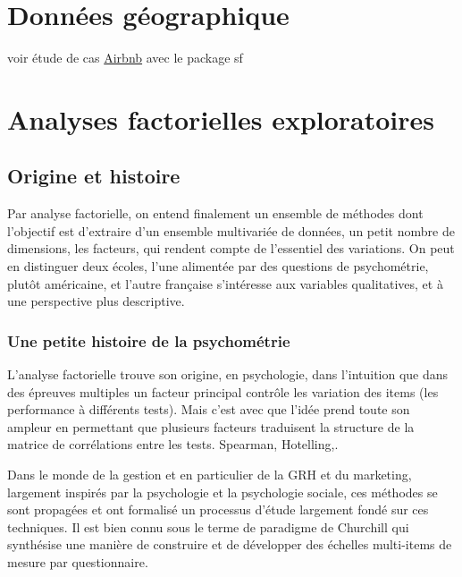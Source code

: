 \documentclass[
]{book}
\begin{document}
\hypertarget{donnuxe9es-guxe9ographique}{%
\chapter{Données géographique}\label{donnuxe9es-guxe9ographique}}

voir étude de cas \href{http://r.benavent.fr/map.html}{Airbnb} avec le package sf

\hypertarget{analyses-factorielles-exploratoires}{%
\chapter{Analyses factorielles exploratoires}\label{analyses-factorielles-exploratoires}}

\hypertarget{origine-et-histoire}{%
\section{Origine et histoire}\label{origine-et-histoire}}

Par analyse factorielle, on entend finalement un ensemble de méthodes dont l'objectif est d'extraire d'un ensemble multivariée de données, un petit nombre de dimensions, les facteurs, qui rendent compte de l'essentiel des variations. On peut en distinguer deux écoles, l'une alimentée par des questions de psychométrie, plutôt américaine, et l'autre française s'intéresse aux variables qualitatives, et à une perspective plus descriptive.

\hypertarget{une-petite-histoire-de-la-psychomuxe9trie}{%
\subsection{Une petite histoire de la psychométrie}\label{une-petite-histoire-de-la-psychomuxe9trie}}

L'analyse factorielle trouve son origine, en psychologie, dans l'intuition que dans des épreuves multiples un facteur principal contrôle les variation des items (les performance à différents tests). Mais c'est avec \citet{thurstone_multiple_1931} que l'idée prend toute son ampleur en permettant que plusieurs facteurs traduisent la structure de la matrice de corrélations entre les tests. Spearman, Hotelling,.

Dans le monde de la gestion et en particulier de la GRH et du marketing, largement inspirés par la psychologie et la psychologie sociale, ces méthodes se sont propagées et ont formalisé un processus d'étude largement fondé sur ces techniques. Il est bien connu sous le terme de paradigme de Churchill qui synthésise une manière de construire et de développer des échelles multi-items de mesure par questionnaire.
\end{document}
